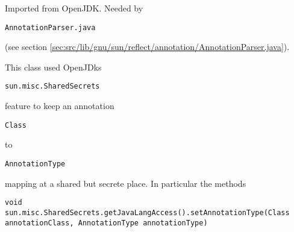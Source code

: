 \documentclass[a4paper, 10pt, titlepage]{scrartcl} %
\begin{document}
Imported from OpenJDK. Needed by \begin{scriptsize}\verb|AnnotationParser|\hspace{0.0pt}\verb|.|\hspace{0.0pt}\verb|java|\end{scriptsize} (see section \ref{sec:src/lib/gnu/sun/reflect/annotation/AnnotationParser.java}).

This class used OpenJDks \begin{scriptsize}\verb|sun|\hspace{0.0pt}\verb|.|\hspace{0.0pt}\verb|misc|\hspace{0.0pt}\verb|.|\hspace{0.0pt}\verb|SharedSecrets|\end{scriptsize} feature to keep an
annotation \begin{scriptsize}\verb|Class|\end{scriptsize} to \begin{scriptsize}\verb|AnnotationType|\end{scriptsize} mapping at a shared but secrete
place. In particular the methods
\begin{scriptsize}\verb|void|\hspace{0.0pt}\verb| |\hspace{0.0pt}\verb|sun|\hspace{0.0pt}\verb|.|\hspace{0.0pt}\verb|misc|\hspace{0.0pt}\verb|.|\hspace{0.0pt}\verb|SharedSecrets|\hspace{0.0pt}\verb|.|\hspace{0.0pt}\verb|getJavaLangAccess|\hspace{0.0pt}\verb|(|\hspace{0.0pt}\verb||\hspace{0.0pt}\verb|)|\hspace{0.0pt}\verb||\hspace{0.0pt}\verb|.|\hspace{0.0pt}\verb|setAnnotationType|\hspace{0.0pt}\verb|(|\hspace{0.0pt}\verb|Class|\hspace{0.0pt}\verb| |\hspace{0.0pt}\verb|annotationClass|\hspace{0.0pt}\verb|,|\hspace{0.0pt}\verb||\hspace{0.0pt}\verb| |\hspace{0.0pt}\verb|AnnotationType|\hspace{0.0pt}\verb| |\hspace{0.0pt}\verb|annotationType|\hspace{0.0pt}\verb|)|\hspace{0.0pt}\verb||\end{scriptsize}
\end{document}
